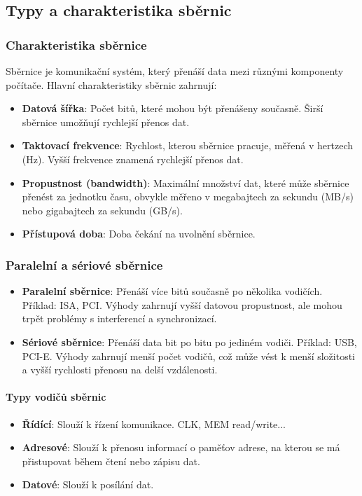 \subsection{Typy a charakteristika sběrnic}

\subsubsection{Charakteristika sběrnice}
Sběrnice je komunikační systém, který přenáší data mezi různými komponenty počítače. Hlavní charakteristiky sběrnic zahrnují:

\begin{itemize}
\item \textbf{Datová šířka}: Počet bitů, které mohou být přenášeny současně. Širší sběrnice umožňují rychlejší přenos dat.
\item \textbf{Taktovací frekvence}: Rychlost, kterou sběrnice pracuje, měřená v hertzech (Hz). Vyšší frekvence znamená rychlejší přenos dat.
\item \textbf{Propustnost (bandwidth)}: Maximální množství dat, které může sběrnice přenést za jednotku času, obvykle měřeno v megabajtech za sekundu (MB/s) nebo gigabajtech za sekundu (GB/s).
\item \textbf{Přístupová doba}: Doba čekání na uvolnění sběrnice.
\end{itemize}

\subsubsection{Paralelní a sériové sběrnice}
\begin{itemize}
\item \textbf{Paralelní sběrnice}: Přenáší více bitů současně po několika vodičích. Příklad: ISA, PCI. Výhody zahrnují vyšší datovou propustnost, ale mohou trpět problémy s interferencí a synchronizací.
\item \textbf{Sériové sběrnice}: Přenáší data bit po bitu po jediném vodiči. Příklad: USB, PCI-E. Výhody zahrnují menší počet vodičů, což může vést k menší složitosti a vyšší rychlosti přenosu na delší vzdálenosti.
\end{itemize}

\paragraph{Typy vodičů sběrnic}
\begin{itemize}
    \item \textbf{Řídící}: Slouží k řízení komunikace. CLK, MEM read/write...
    \item \textbf{Adresové}: Slouží k přenosu informací o paměťov adrese, na kterou se má přistupovat během čtení nebo zápisu dat. 
    \item \textbf{Datové}: Slouží k posílání dat.
\end{itemize}


